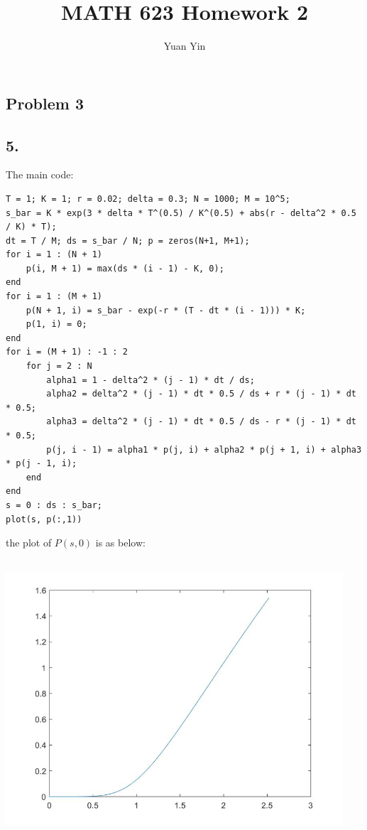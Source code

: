 \documentclass[letterpaper,11pt]{article}
\author{Yuan Yin}
\title{MATH 623 Homework 2}
\begin{document}
\large
\maketitle
\begin{spacing}{1.2}  %
\section*{Problem 3}
\subsection*{5.}
The main code:
\begin{lstlisting}
T = 1; K = 1; r = 0.02; delta = 0.3; N = 1000; M = 10^5;
s_bar = K * exp(3 * delta * T^(0.5) / K^(0.5) + abs(r - delta^2 * 0.5 / K) * T);
dt = T / M; ds = s_bar / N; p = zeros(N+1, M+1);
for i = 1 : (N + 1)
    p(i, M + 1) = max(ds * (i - 1) - K, 0);
end
for i = 1 : (M + 1)
    p(N + 1, i) = s_bar - exp(-r * (T - dt * (i - 1))) * K;
    p(1, i) = 0;
end
for i = (M + 1) : -1 : 2
    for j = 2 : N
        alpha1 = 1 - delta^2 * (j - 1) * dt / ds;
        alpha2 = delta^2 * (j - 1) * dt * 0.5 / ds + r * (j - 1) * dt * 0.5;
        alpha3 = delta^2 * (j - 1) * dt * 0.5 / ds - r * (j - 1) * dt * 0.5;
        p(j, i - 1) = alpha1 * p(j, i) + alpha2 * p(j + 1, i) + alpha3 * p(j - 1, i);
    end
end
s = 0 : ds : s_bar;
plot(s, p(:,1))
\end{lstlisting}
the plot of $P(s,0)$ is as below:

\includegraphics[width=4.95in,height=4.05in]{p_s_0.jpg}
\end{spacing}
\end{document}
